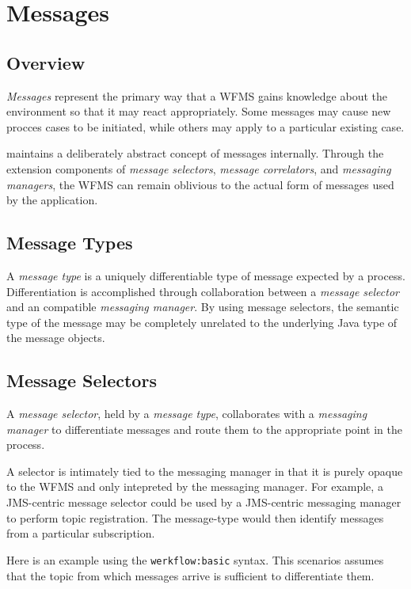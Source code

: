 \chapter{Messages}

\section{Overview}

\emph{Messages} represent the primary way that a
WFMS gains knowledge about the environment so that it
may react appropriately.  Some messages may cause new
procces cases to be initiated, while others may apply
to a particular existing case.  

{\werkflow} maintains a deliberately abstract concept
of messages internally.  Through the extension components
of \emph{message selectors}, \emph{message correlators},
and \emph{messaging managers}, the WFMS can remain
oblivious to the actual form of messages used by the application.

\section{Message Types}

A \emph{message type} is a uniquely differentiable type
of message expected by a process.  Differentiation is accomplished
through collaboration between a \emph{message selector} and
an compatible \emph{messaging manager}.   By using 
message selectors, the semantic type of the message may be
completely unrelated to the underlying Java type of the
message objects.

\section{Message Selectors}

A \emph{message selector}, held by a \emph{message type}, 
collaborates with a \emph{messaging manager} to differentiate
messages and route them to the appropriate point in the process.

A selector is intimately tied to the messaging manager in that it
is purely opaque to the WFMS and only intepreted by the messaging
manager.  For example, a JMS-centric message selector could be
used by a JMS-centric messaging manager to perform topic registration.
The message-type would then identify messages from a particular
subscription. 

Here is an example using the \verb|werkflow:basic| syntax.  This
scenarios assumes that the topic from which messages arrive is
sufficient to differentiate them.

